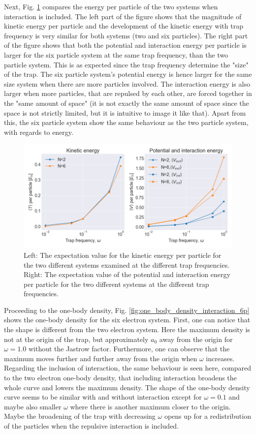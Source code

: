 Next, Fig. \ref{fig:energy_per_particle_compared} compares the energy per particle of the two systems when interaction is included. The left part of the figure shows that the magnitude of kinetic energy per particle and the development of the kinetic energy with trap frequency is very similar for both systems (two and six particles). The right part of the figure shows that both the potential and interaction energy per particle is larger for the six particle system at the same trap frequency, than the two particle system. This is as expected since the trap frequency determine the "size" of the trap. The six particle system's potential energy is hence larger for the same size system when there are more particles involved. The interaction energy is also larger when more particles, that are repulsed by each other, are forced together in the "same amount of space" (it is not exactly the same amount of space since the space is not strictly limited, but it is intuitive to image it like that). Apart from this, the six particle system show the same behaviour as the two particle system, with regards to energy. 

\begin{figure}[H]
\center
\includegraphics[width=0.85\linewidth]{../Results/energy_per_particle_compared}\caption{Left: The expectation value for the kinetic energy per particle for the two different systems examined at the different trap frequencies. Right: The expectation value of the potential and interaction energy per particle for the two different systems at the different trap frequencies.  }\label{fig:energy_per_particle_compared}
\end{figure}

Proceeding to the one-body density, Fig. \ref{fig:one_body_density_interaction_6p} shows the one-body density for the six electron system. First, one can notice that the shape is different from the two electron system. Here the maximum density is not at the origin of the trap, but approximately $a_0$ away from the origin for $\omega=1.0$ without the Jastrow factor. Furthermore, one can observe that the maximum moves further and further away from the origin when $\omega$ increases. Regarding the inclusion of interaction, the same behaviour is seen here, compared to the two electron one-body density, that including interaction  broadens the whole curve and lowers the maximum density. The shape of the one-body density curve seems to be similar with and without interaction except for $\omega = 0.1$ and maybe also smaller $\omega$ where there is another maximum closer to the origin. Maybe the broadening of the trap with decreasing $\omega$ opens up for a redistribution of the particles when the repulsive interaction is included. 

